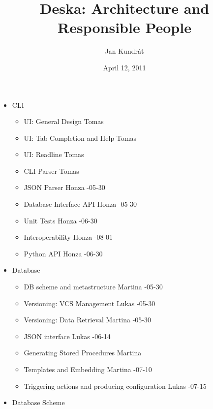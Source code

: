 \documentclass{article}
\begin{document}
\title{Deska: Architecture and Responsible People}

\author{Jan Kundrát}

\date{April 12, 2011}

\maketitle

\TabPositions{12cm,14cm}

\begin{itemize}
    \item CLI
        \begin{itemize}
            \item UI: General Design \tab Tomas
            \item UI: Tab Completion and Help \tab Tomas
            \item UI: Readline \tab Tomas
            \item CLI Parser \tab Tomas
            \item JSON Parser \tab Honza -05-30
            \item Database Interface API \tab Honza -05-30
            \item Unit Tests \tab Honza -06-30
            \item Interoperability \tab Honza -08-01
            \item Python API \tab Honza -06-30
        \end{itemize}
    \item Database
        \begin{itemize}
            \item DB scheme and metastructure \tab Martina -05-30
            \item Versioning: VCS Management \tab Lukas -05-30
            \item Versioning: Data Retrieval \tab Martina -05-30
            \item JSON interface \tab Lukas -06-14
            \item Generating Stored Procedures \tab Martina
            \item Templates and Embedding \tab Martina -07-10
            \item Triggering actions and producing configuration \tab Lukas -07-15
        \end{itemize}
    \item Database Scheme

\end{itemize}
\end{document}
